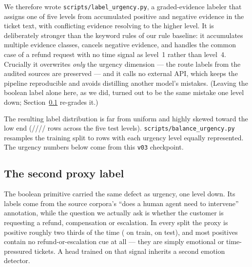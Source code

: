 \documentclass[11pt,a4paper]{article}
\begin{document}
We therefore wrote \texttt{scripts/label\_urgency.py}, a graded-evidence labeler that assigns one of five levels from accumulated positive and negative evidence in the ticket text, with conflicting evidence resolving to the higher level. It is deliberately stronger than the keyword rules of our rule baseline: it accumulates multiple evidence classes, cancels negative evidence, and handles the common case of a refund request with no time signal as level~1 rather than level~4. Crucially it overwrites \emph{only} the urgency dimension --- the route labels from the audited sources are preserved --- and it calls no external API, which keeps the pipeline reproducible and avoids distilling another model's mistakes. (Leaving the boolean label alone here, as we did, turned out to be the same mistake one level down; Section~\ref{sec:noul} re-grades it.)

The resulting label distribution is far from uniform and highly skewed toward the low end (\UrgDistAfterZero/\UrgDistAfterOne/\UrgDistAfterTwo/\UrgDistAfterThree/\UrgDistAfterFour{} rows across the five test levels). \texttt{scripts/balance\_urgency.py} resamples the training split to \RowsTrainBalanced{} rows with each urgency level equally represented. The urgency numbers below come from this \texttt{v03} checkpoint.

\subsection{The second proxy label}
\label{sec:noul}

The boolean primitive carried the same defect as urgency, one level down. Its labels come from the source corpora's ``does a human agent need to intervene'' annotation, while the question we actually ask is whether the customer is requesting a refund, compensation or escalation. In every split the proxy is positive roughly two thirds of the time (\NoulPosBefore{} on train, \NoulPosTestBefore{} on test), and most positives contain no refund-or-escalation cue at all --- they are simply emotional or time-pressured tickets. A head trained on that signal inherits a second emotion detector.
\end{document}

